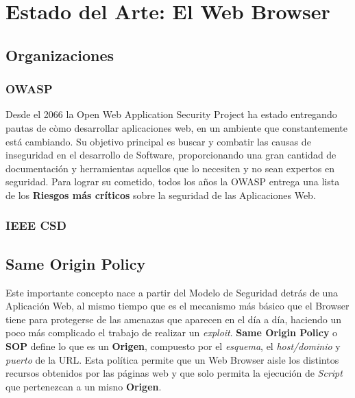 \chapter{Estado del Arte: El Web Browser}
\label{chap:chap2}


\section{Organizaciones}
\label{chap:Orgs}

\subsection{OWASP}
Desde el 2066 la Open Web Application Security Project ha estado entregando pautas de còmo desarrollar aplicaciones web, en un ambiente que constantemente está cambiando. Su objetivo principal es buscar y combatir las causas de inseguridad en el desarrollo de Software, proporcionando una gran cantidad de documentación y herramientas aquellos que lo necesiten y no sean expertos en seguridad. Para lograr su cometido, todos los años la OWASP entrega una lista de los \textbf{Riesgos más críticos} sobre la seguridad de las Aplicaciones Web.

\subsection{IEEE CSD}



\section{Same Origin Policy}
\label{chap:SOP}

Este importante concepto nace a partir del Modelo de Seguridad detrás de una Aplicación Web, al mismo tiempo que es el mecanismo más básico que el Browser tiene para protegerse de las amenazas que aparecen en el día a día, haciendo un poco más complicado el trabajo de realizar un \textit{exploit}. \textbf{Same Origin Policy} o \textbf{SOP} define lo que es un \textbf{Origen}, compuesto por el \textit{esquema}, el \textit{host/dominio} y \textit{puerto} de la URL. Esta política permite que un Web Browser aisle los distintos recursos obtenidos por las páginas web y que solo permita la ejecución de \textit{Script} que pertenezcan a un misno \textbf{Origen}. 

